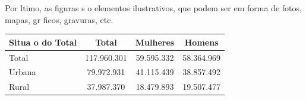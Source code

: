 \documentclass{article}
\begin{document}
Por  ltimo, as figuras s o elementos ilustrativos, que podem ser em forma de fotos, mapas, gr ficos, gravuras, etc.

\begin{table}[H]
{
\begin{tabular}{m{2.0cm}ccc}
 \toprule
 Situa o do Total & Total & Mulheres & Homens \\
\midrule
Total & 117.960.301 & 59.595.332 & 58.364.969 \\
Urbana & 79.972.931 & 41.115.439 & 38.857.492 \\
Rural & 37.987.370 & 18.479.893 & 19.507.477 \\
\bottomrule
\end{tabular}
}
{
}
\end{table}
		
\end{document}
